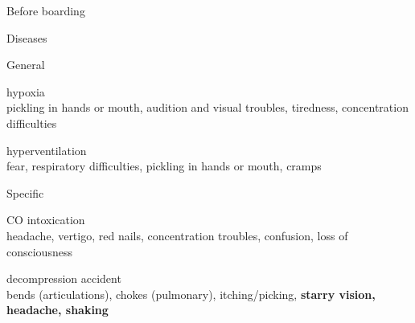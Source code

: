 \documentclass{checklists}
\begin{document}
\vspace{5mm}
\begin{CheckListRule}{Before boarding}{}%
	\vspace{2mm}
\end{CheckListRule}%
\vfill
\begin{SubWrapper}{Diseases}{}%
	\vspace{5mm}
\begin{SubCheckList}{General}{}%
	\item hypoxia\\\phantom{boooo}
		pickling in hands or mouth, audition and visual troubles, tiredness, concentration difficulties
	\item hyperventilation\\\phantom{boooo}
		fear, respiratory difficulties, pickling in hands or mouth, cramps
\end{SubCheckList}%
\begin{SubCheckList}{Specific}%
	\item CO intoxication\\\phantom{boooo}
		headache, vertigo, red nails, concentration troubles, confusion, loss of consciousness
	\item decompression accident\\\phantom{boooo}
		bends (articulations), chokes (pulmonary), itching/picking, \textbf{starry vision, headache, shaking}
\end{SubCheckList}%
\end{SubWrapper}%
\SkipPage
%
\end{document}
